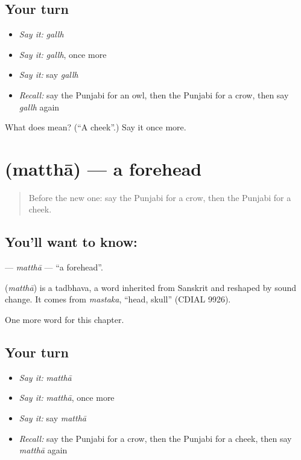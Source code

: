 \subsection*{Your turn}
\begin{itemize}
\raggedright
  \item \emph{Say it:} \emph{gallh}
  \item \emph{Say it:} \emph{gallh}, once more
  \item \emph{Say it:} say \emph{gallh}
  \item \emph{Recall:} say the Punjabi for an owl, then the Punjabi for a crow, then say \emph{gallh} again
\end{itemize}

\begin{tcolorbox}[breakable,colback=teal!4,colframe=teal!35!black,title={Before you move on}]
What does  mean? (\textquotedblleft{}A cheek\textquotedblright{}.) Say it once more.
\end{tcolorbox}
\section[\texorpdfstring{\pa{ਮੱਥਾ} (matthā)}{ਮੱਥਾ (matthā)}]{ (matthā) — a forehead}

\label{lesson:PA-C134-mattha}



\begin{quote}
Before the new one: say the Punjabi for a crow, then the Punjabi for a cheek.
\end{quote}

\subsection*{You'll want to know: }
\textbf{} — \emph{matthā} — \textquotedblleft{}a forehead\textquotedblright{}.

\begin{cousinweb}
\textbf{} (\emph{matthā}) is a tadbhava, a word inherited from Sanskrit and reshaped by sound change. It comes from \emph{mastaka}, \textquotedblleft{}head, skull\textquotedblright{} (CDIAL 9926).
\end{cousinweb}

\begin{grammarlens}[title={What you've built}]
One more word for this chapter.
\end{grammarlens}

\subsection*{Your turn}
\begin{itemize}
\raggedright
  \item \emph{Say it:} \emph{matthā}
  \item \emph{Say it:} \emph{matthā}, once more
  \item \emph{Say it:} say \emph{matthā}
  \item \emph{Recall:} say the Punjabi for a crow, then the Punjabi for a cheek, then say \emph{matthā} again
\end{itemize}

